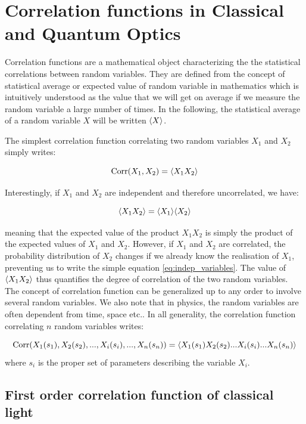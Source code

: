 \section{Correlation functions in Classical and Quantum Optics}

Correlation functions are a mathematical object characterizing the the statistical correlations between random variables. They are defined from the concept of statistical average or expected value of random variable in mathematics which is intuitively understood as the value that we will get on average if we measure the random variable a large number of times. In the following, the statistical average of a random variable $X$ will be written $\langle X\rangle$.

The simplest correlation function correlating two random variables $X_1$ and $X_2$ simply writes:

\begin{equation}
    \text{Corr}(X_1,X_2)=\langle X_1 X_2\rangle
\end{equation}

\noindent Interestingly, if $X_1$ and $X_2$ are independent and therefore uncorrelated, we have:

\begin{equation}
    \langle X_1 X_2\rangle = \langle X_1\rangle \langle X_2\rangle
    \label{eq:indep_variables}
\end{equation}

\noindent meaning that the expected value of the product $X_1 X_2$ is simply the product of the expected values of $X_1$ and $X_2$. However, if $X_1$ and $X_2$ are correlated, the probability distribution of $X_2$ changes if we already know the realisation of $X_1$, preventing us to write the simple equation \ref{eq:indep_variables}. The value of $\langle X_1 X_2\rangle$ thus quantifies the degree of correlation of the two random variables. The concept of correlation function can be generalized up to any order to involve several random variables. We also note that in physics, the random variables are often dependent from time, space etc.. In all generality, the correlation function correlating $n$ random variables writes:

\begin{equation}
    \text{Corr}(X_1(s_1),X_2(s_2),...,X_i(s_i),...,X_n(s_n)) = \langle X_1(s_1) X_2(s_2) ... X_i(s_i) ... X_n(s_n)\rangle 
\end{equation}
\noindent where $s_i$ is the proper set of parameters describing the variable $X_i$.

\subsection{First order correlation function of classical light}

